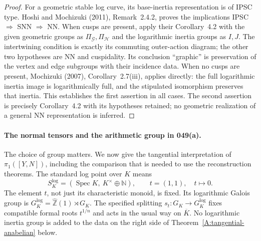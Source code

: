 \begin{proof}
For a geometric stable log curve, its base-inertia representation is
of IPSC type. Hoshi and Mochizuki (2011), Remark~2.4.2, proves the
implications IPSC $\Rightarrow$ SNN $\Rightarrow$ NN. When cusps
are present, apply their Corollary~4.2 with the given geometric groups
as $\Pi_{\mathcal G},\Pi_{\mathcal H}$ and the logarithmic inertia
groups as $I,J$. The intertwining condition is exactly its commuting
outer-action diagram; the other two hypotheses are NN and cuspidality.
Its conclusion ``graphic'' is preservation of the vertex and edge
subgroups with their incidence data. When no cusps are present,
Mochizuki (2007), Corollary~2.7(iii), applies directly: the full
logarithmic inertia image is logarithmically full, and the stipulated
isomorphism preserves that inertia. This establishes the first
assertion in all cases. The second assertion is precisely
Corollary~4.2 with its hypotheses retained; no geometric realization
of a general NN representation is inferred.
\end{proof}

\paragraph{The normal tensors and the arithmetic group in 049(a).}
The choice of group matters. We now give the tangential interpretation of
$\pi_1([Y,N])$, including the comparison that is needed to use the
reconstruction theorems. The standard log point over $K$ means
\[
 S_K^{\log}=(\operatorname{Spec}K,\ K^\times\oplus\mathbb N),
 \qquad t=(1,1),\quad t\longmapsto0.
\]
The element $t$, not just its characteristic monoid, is fixed. Its
logarithmic Galois group is
$G_K^{\log}=\widehat{\mathbb Z}(1)\rtimes G_K$. The specified splitting
$s_t:G_K\to G_K^{\log}$ fixes compatible formal roots $t^{1/n}$ and
acts in the usual way on $\overline K$. No logarithmic inertia group is
added to the data on the right side of Theorem~\ref{A:tangential-anabelian}
below.

